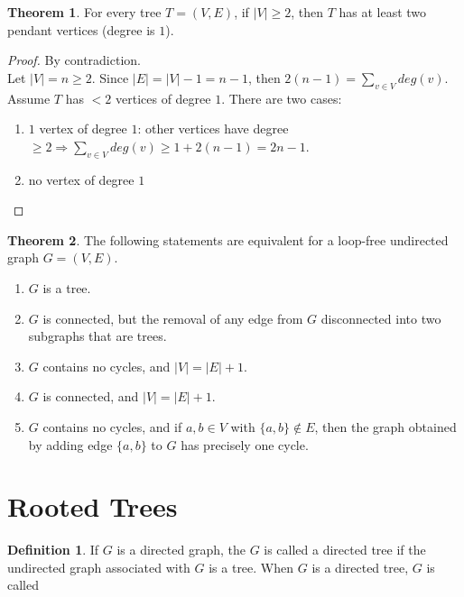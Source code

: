 \documentclass[letter]{book}
\theoremstyle{definition}
\newtheorem{theorem}{Theorem}[chapter]
\theoremstyle{definition}
\newtheorem{mydef}{Definition}[chapter]
\theoremstyle{remark}
\begin{document}
\begin{theorem}
    For every tree $T=(V,E)$, if $|V|\geq2$, then $T$ has at least two pendant vertices (degree is $1$).
    \begin{proof} By contradiction.\\
        Let $|V|=n\geq2$. Since $|E|=|V|-1=n-1$, then $2(n-1)=\sum_{v\in V}{deg(v)}$.\\
        Assume $T$ has $<2$ vertices of degree $1$. There are two cases:
        \begin{enumerate}
            \item $1$ vertex of degree $1$: other vertices have degree $\geq 2\Rightarrow \sum_{v\in V}{deg(v)}\geq 1+2(n-1)=2n-1$.
            \item no vertex of degree $1$
        \end{enumerate}
    \end{proof}
\end{theorem}
\bigskip
\begin{theorem}
    The following statements are equivalent for a loop-free undirected graph $G=(V,E)$.
    \begin{enumerate}[label=\alph*)]
        \item $G$ is a tree.
        \item $G$ is connected, but the removal of any edge from $G$ disconnected into two subgraphs that are trees.
        \item $G$ contains no cycles, and $|V|=|E|+1$.
        \item $G$ is connected, and $|V|=|E|+1$.
        \item $G$ contains no cycles, and if $a,b\in V$ with $\{a,b\}\notin E$, then the graph obtained by adding edge $\{a,b\}$ to $G$ has precisely one cycle.
    \end{enumerate}
\end{theorem}

\section{Rooted Trees}
\begin{mydef}
    If $G$ is a directed graph, the $G$ is called a directed tree if the undirected graph associated with $G$ is a tree. When $G$ is a directed tree, $G$ is called 
\end{mydef}
\end{document}
